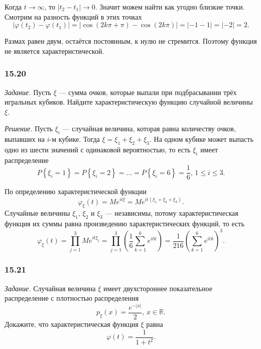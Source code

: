 \begin{enumerate}[label=\alph*)]
Когда $t \rightarrow \infty $, то $ \left| t_2 - t_1 \right| \rightarrow 0$.
Значит можем найти как угодно близкие точки.
Смотрим на разность функций в этих точках
$$ \left| \varphi \left( t_2 \right) - \varphi \left( t_1 \right) \right| =
  \left| \cos \left( 2k \pi + \pi \right) - \cos \left( 2k \pi \right) \right| =
  \left| - 1 - 1 \right| =
  \left| - 2 \right| =
  2.$$

Размах равен двум, остаётся постоянным, к нулю не стремится.
Поэтому функция не является характеристической.
\end{enumerate}

\subsubsection*{15.20}

\textit{Задание.}
Пусть $ \xi $ --- сумма очков, которые выпали при подбрасывании трёх игральных кубиков.
Найдите характеристическую функцию случайной величины $ \xi $.

\textit{Решение.}
Пусть $ \xi_i$ --- случайная величина, которая равна количеству очков, выпавших на $i$-м кубике.
Тогда $ \xi = \xi_1 + \xi_2 + \xi_3$.
На одном кубике может выпасть одно из шести значений с одинаковой вероятностью,
то есть $ \xi_i$ имеет распределение
$$P \left\{ \xi_i = 1 \right\} =
  P \left\{ \xi_i = 2 \right\} =
  \dotsc =
  P \left\{ \xi_i = 6 \right\} =
  \frac{1}{6}, \,
  1 \leq i \leq 3.$$

По определению характеристической функции
$$ \varphi_{ \xi } \left( t \right) =
  Me^{it \xi} =
  Me^{it \left( \xi_1 + \xi_2 + \xi_3 \right) }.$$
Случайные величины $ \xi_1, \, \xi_2$ и $ \xi_3$ --- независимы,
потому характеристическая функция их суммы равна произведению характеристических функций, то есть
$$ \varphi_{ \xi } \left( t \right) =
  \prod \limits_{j = 1}^3 Me^{it \xi_j} =
  \prod \limits_{j = 1}^3 \left( \frac{1}{6} \sum \limits_{k = 1}^6 e^{itk} \right) =
  \frac{1}{216} \left( \sum \limits_{k=1}^6 e^{itk} \right)^3.$$

\subsubsection*{15.21}

\textit{Задание.}
Случайная величина $ \xi $
имеет двухстороннее показательное распределение с плотностью распределения
$$p_{ \xi } \left( x \right) =
  \frac{e^{- \left| x \right| }}{2}, \,
  x \in \mathbb{R}.$$
Докажите, что характеристическая функция $ \xi $ равна
$$ \varphi \left( t \right) =
  \frac{1}{1 + t^2}.$$

